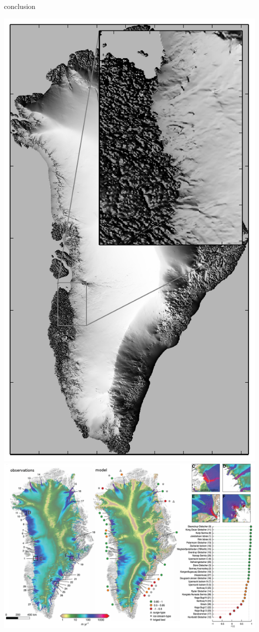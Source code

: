 \documentclass[hide notes,intlimits]{beamer}
\begin{document}
\begin{frame}{conclusion}
\begin{itemize}
\vspace{2mm}
\begin{center}
\includegraphics[height=0.45\textheight]{grnwinset} \qquad
\includegraphics[height=0.45\textheight]{greenland-overview-relabel}
\end{center}
\end{itemize}
\end{frame}
\end{document}
